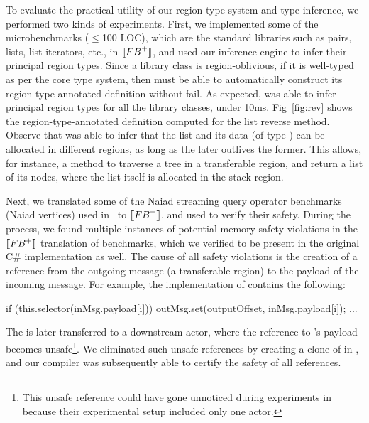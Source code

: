 To evaluate the practical utility of our region type system and type
inference, we 
performed two kinds of experiments. First, we implemented some of the
microbenchmarks ($\le$100 LOC), which are the standard libraries such
as pairs, lists, list iterators, etc., in $\llbracket {\sc FB}^+ \rrbracket$, and used
our inference engine to infer their principal region types. Since a
library class is region-oblivious, if it is well-typed as per the core
type system, then \namec must be able to automatically construct its
region-type-annotated definition without fail. As expected, \namec was
able to infer principal region types for all the library classes,
under 10ms. Fig~\ref{fig:rev} shows the region-type-annotated
definition computed for the list reverse method. Observe that \namec
was able to infer that the list and its data (of type ) can be
allocated in different regions, as long as the later outlives the
former. This allows, for instance, a  method to traverse a
tree in a transferable region, and return a list of its nodes, where
the list itself is allocated in the stack region. 

Next, we translated some of the Naiad streaming query operator
benchmarks (Naiad vertices) used in~\cite{Broom:HotOS} to
$\llbracket {\sc FB}^+ \rrbracket$, and used \namec to verify their safety. During the
process, we found multiple instances of potential memory safety
violations in the $\llbracket FB^+ \rrbracket$ translation of benchmarks, which we
verified to be present in the original C\# implementation as well. The
cause of all safety violations is the creation of a reference from the
outgoing message (a transferable region) to the payload of the
incoming message. For example, the implementation of 
contains the following:
\begin{codejava}
  if (this.selector(inMsg.payload[i])) {
    outMsg.set(outputOffset, inMsg.payload[i]);
    ...
  } 
\end{codejava}
The  is later transferred to a downstream actor, where the
reference to 's payload becomes unsafe\footnote{This unsafe
reference could have gone unnoticed during experiments
in~\cite{Broom:HotOS} because their experimental setup included only
one actor.}. We eliminated such unsafe references by creating a clone
of  in , and our compiler was
subsequently able to certify the safety of all references. 

